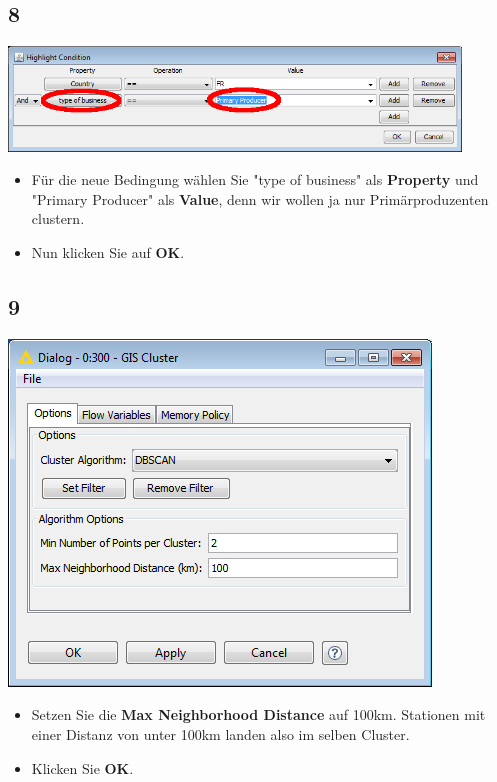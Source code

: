 \documentclass{beamer}
\begin{document}
\subsection{8}
\begin{frame}
	\begin{center}
  		\includegraphics[width=0.9\textwidth]{8.png}
	\end{center}
	\begin{itemize}
		\item Für die neue Bedingung wählen Sie "type of business" als \textbf{Property} und "Primary Producer" als \textbf{Value}, denn wir wollen ja nur Primärproduzenten clustern.
		\item Nun klicken Sie auf \textbf{OK}.
	\end{itemize}
\end{frame}

\subsection{9}
\begin{frame}
	\begin{center}
  		\includegraphics[height=0.6\textheight]{9.png}
	\end{center}
	\begin{itemize}
		\item Setzen Sie die \textbf{Max Neighborhood Distance} auf 100km. Stationen mit einer Distanz von unter 100km landen also im selben Cluster.
		\item Klicken Sie \textbf{OK}.
	\end{itemize}
\end{frame}
\end{document}
